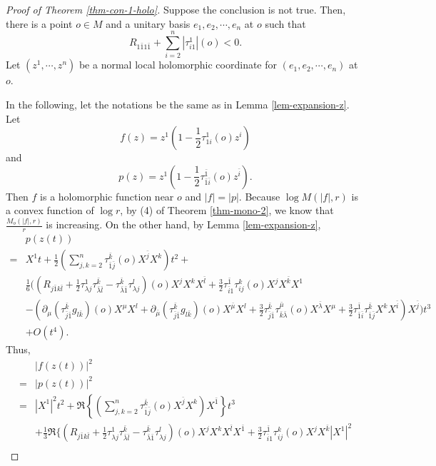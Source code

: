 \documentclass[12pt]{amsart}
\def\bk{{\bar k}}
\def\bl{{\bar l}}
\def\p{\partial}
\theoremstyle{definition}
\theoremstyle{remark}
\numberwithin{equation}{section}
\def\bi{{\bar i}}
\def\bj{{\bar j}}
\begin{document}
\begin{proof}[Proof of Theorem \ref{thm-con-1-holo}]
Suppose the conclusion is not true. Then, there is a point $o\in M$ and a unitary basis $e_1,e_2,\cdots,e_n$ at $o$ such that
\begin{equation}
R_{1\bar11\bar1}+\sum_{i=2}^n|\tau_{i1}^1|(o)<0.
\end{equation}
Let $(z^1,\cdots,z^n)$ be a normal local holomorphic coordinate for $(e_1,e_2,\cdots,e_n)$ at $o$.

In the following, let the notations be the same as in Lemma \ref{lem-expansion-z}. Let $$f(z)=z^1\left(1-\frac12\tau_{1i}^{1}(o)z^i\right)$$ and $$p(z)=z^1\left(1-\frac12\tau_{\bar 1\bi}^{\bar 1}(o)z^\bi\right).$$ Then $f$ is a holomorphic function near $o$ and $|f|=|p|$. Because $\log M(|f|,r)$ is a convex function of $\log r$, by (4) of Theorem \ref{thm-mono-2}, we know that $\frac{M_o(|f|,r)}{r} $ is increasing. On the other hand, by Lemma \ref{lem-expansion-z},
\begin{equation*}
\begin{split}
&p(z(t))\\
=&X^1t+\frac12\left(\sum_{j,k=2}^n\tau_{\bar 1\bj}^\bk(o) X^\bj X^k\right)t^2+\\
&\frac16\bigg(\left(R_{j\bar 1 k\bl}+\frac12\tau_{\lambda j}^1\tau_{\bar\lambda\bar l}^\bk -\tau_{\bar \lambda \bar 1}^\bk\tau_{\lambda j}^l\right)(o) X^j X^k X^{\bar l}+\frac32\tau_{\bi 1}^{\bar 1}\tau_{ij}^k(o)X^jX^\bk X^1 \\
&-\left(\p_\mu(\tau_{\bar j\bar 1}^\bk g_{l\bk})(o)X^\mu X^l
+\p_{\bar \mu}(\tau_{\bar j\bar 1}^\bk g_{l\bk})(o)X^{\bar\mu}X^l+\frac32\tau_{\bar j\bar 1}^\bk\tau_{\bar k\bar\lambda}^{\bar \mu}(o)X^{\bar\lambda}X^\mu+\frac32\tau_{\bar 1\bar i}^{\bar 1}\tau_{\bar 1\bj}^\bk X^k X^\bi\right) X^{\bar j}\bigg)t^3\\
&+O(t^4).
\end{split}
\end{equation*}
Thus,
\begin{equation*}
\begin{split}
&|f(z(t))|^2\\
=&|p(z(t))|^2\\
=&|X^1|^2t^2+\Re\left\{\left(\sum_{j,k=2}^n\tau_{\bar 1\bj}^\bk(o) X^\bj X^k\right)X^{\bar 1}\right\}t^3\\
&+\frac13\Re\bigg\{\left(R_{j\bar 1 k\bl}+\frac12\tau_{\lambda j}^1\tau_{\bar\lambda\bar l}^\bk -\tau_{\bar \lambda \bar 1}^\bk\tau_{\lambda j}^l\right)(o) X^j X^k X^{\bar l}X^{\bar 1}+\frac32\tau_{\bi 1}^{\bar 1}\tau_{ij}^k(o)X^jX^\bk |X^1|^2 \\

\end{split}
\end{equation*}
\end{proof}
\end{document}
